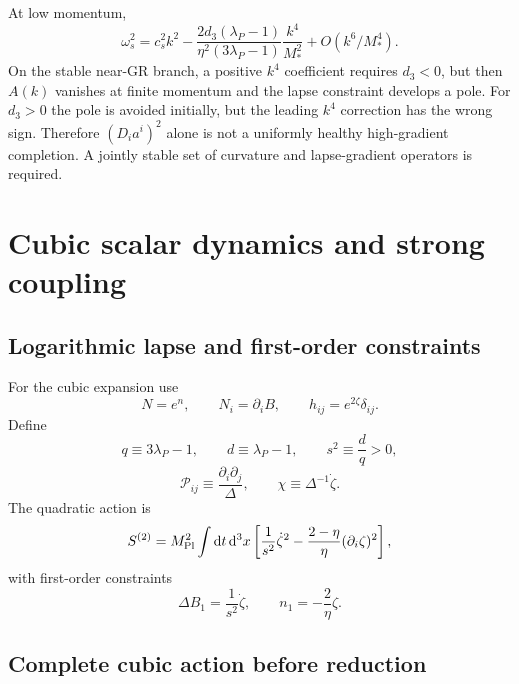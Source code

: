 \documentclass[11pt]{article}
\newcommand{\Mpl}{M_{\rm Pl}}
\newcommand{\Ms}{M_*}
\newcommand{\dd}{\mathrm{d}}
\newcommand{\Del}{\Delta}
\newcommand{\cs}{c_s}
\newcommand{\Pc}{\mathcal P}
\begin{document}
At low momentum,
\begin{equation}
\omega_s^2=\cs^2k^2-
\frac{2d_3(\lambda_P-1)}{\eta^2(3\lambda_P-1)}\frac{k^4}{\Ms^2}
+O(k^6/\Ms^4).
\label{eq:k4}
\end{equation}
On the stable near-GR branch, a positive $k^4$ coefficient requires $d_3<0$, but then $A(k)$ vanishes at finite momentum and the lapse constraint develops a pole.  For $d_3>0$ the pole is avoided initially, but the leading $k^4$ correction has the wrong sign.  Therefore $(D_i a^i)^2$ alone is not a uniformly healthy high-gradient completion.  A jointly stable set of curvature and lapse-gradient operators is required.

\section{Cubic scalar dynamics and strong coupling}

\subsection{Logarithmic lapse and first-order constraints}

For the cubic expansion use
\begin{equation}
N=e^n,\qquad N_i=\partial_iB,\qquad h_{ij}=e^{2\zeta}\delta_{ij}.
\label{eq:cubicgauge}
\end{equation}
Define
\begin{equation}
q\equiv3\lambda_P-1,\qquad d\equiv\lambda_P-1,
\qquad s^2\equiv\frac{d}{q}>0,
\label{eq:sdefs}
\end{equation}
\begin{equation}
\Pc_{ij}\equiv\frac{\partial_i\partial_j}{\Del},
\qquad \chi\equiv\Del^{-1}\dot\zeta.
\end{equation}
The quadratic action is
\begin{equation}
S^{(2)}=\Mpl^2\int \dd t\,\dd^3x
\left[\frac{1}{s^2}\dot\zeta^2-
\frac{2-\eta}{\eta}(\partial_i\zeta)^2\right],
\label{eq:S2cubicnotation}
\end{equation}
with first-order constraints
\begin{equation}
\Del B_1=\frac{1}{s^2}\dot\zeta,
\qquad n_1=-\frac{2}{\eta}\zeta.
\label{eq:firstconstraints}
\end{equation}

\subsection{Complete cubic action before reduction}
\end{document}
